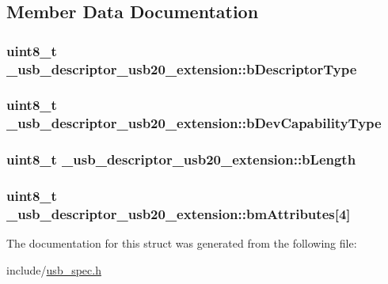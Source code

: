 \subsection{Member Data Documentation}
\hypertarget{struct__usb__descriptor__usb20__extension_a1f19d1d6296755b04b238d7d00d1ba5e}{
\subsubsection[{b\-Descriptor\-Type}]{\setlength{\rightskip}{0pt plus 5cm}uint8\-\_\-t \-\_\-usb\-\_\-descriptor\-\_\-usb20\-\_\-extension\-::b\-Descriptor\-Type}}\label{struct__usb__descriptor__usb20__extension_a1f19d1d6296755b04b238d7d00d1ba5e}
\hypertarget{struct__usb__descriptor__usb20__extension_a7763483aaf68ac9a250f50e457206390}{
\subsubsection[{b\-Dev\-Capability\-Type}]{\setlength{\rightskip}{0pt plus 5cm}uint8\-\_\-t \-\_\-usb\-\_\-descriptor\-\_\-usb20\-\_\-extension\-::b\-Dev\-Capability\-Type}}\label{struct__usb__descriptor__usb20__extension_a7763483aaf68ac9a250f50e457206390}
\hypertarget{struct__usb__descriptor__usb20__extension_a19dabf4bce2e48c28ad154710e6883cf}{
\subsubsection[{b\-Length}]{\setlength{\rightskip}{0pt plus 5cm}uint8\-\_\-t \-\_\-usb\-\_\-descriptor\-\_\-usb20\-\_\-extension\-::b\-Length}}\label{struct__usb__descriptor__usb20__extension_a19dabf4bce2e48c28ad154710e6883cf}
\hypertarget{struct__usb__descriptor__usb20__extension_a93cbe8f7fb11eec7f4e869857f0152a2}{
\subsubsection[{bm\-Attributes}]{\setlength{\rightskip}{0pt plus 5cm}uint8\-\_\-t \-\_\-usb\-\_\-descriptor\-\_\-usb20\-\_\-extension\-::bm\-Attributes\mbox{[}4\mbox{]}}}\label{struct__usb__descriptor__usb20__extension_a93cbe8f7fb11eec7f4e869857f0152a2}


The documentation for this struct was generated from the following file\-:\begin{DoxyCompactItemize}
\item 
include/\hyperlink{usb__spec_8h}{usb\-\_\-spec.\-h}\end{DoxyCompactItemize}

